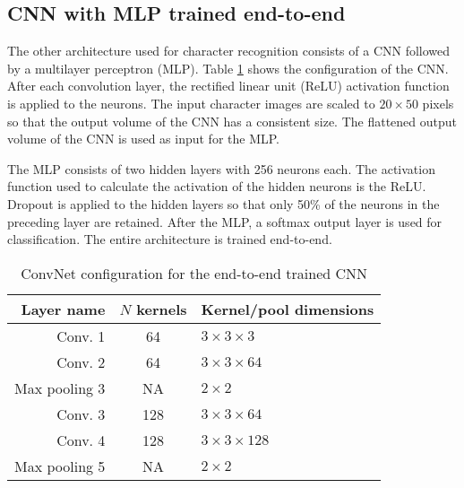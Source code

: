 \subsection{CNN with MLP trained end-to-end}
\label{sec:hmdcnn}

The other architecture used for character recognition consists of a CNN followed by a multilayer perceptron (MLP). Table \ref{tab:hmdcnnconf} shows the configuration of the CNN. After each convolution layer, the rectified linear unit (ReLU) activation function is applied to the neurons. The input character images are scaled to $20 \times 50$ pixels so that the output volume of the CNN has a consistent size. The flattened output volume of the CNN is used as input for the MLP. 

The MLP consists of two hidden layers with 256 neurons each. The activation function used to calculate the activation of the hidden neurons is the ReLU. Dropout is applied to the hidden layers so that only 50\% of the neurons in the preceding layer are retained. After the MLP, a softmax output layer is used for classification. The entire architecture is trained end-to-end. 

\begin{table}
\renewcommand{\arraystretch}{1.3}
\centering
\caption{ConvNet configuration for the end-to-end trained CNN}
\begin{tabular}{r|cl}\hline
Layer name & $N$ kernels & Kernel/pool dimensions \\ \hline \hline
Conv. 1 & 64 & $3 \times 3 \times 3$  \\
Conv. 2 & 64 & $3 \times 3 \times 64$ \\
Max pooling 3 & NA & $2\times 2$ \\
Conv. 3 & 128 & $3 \times 3 \times 64$ \\
Conv. 4 & 128 & $3 \times 3 \times 128$ \\
Max pooling 5 & NA & $2\times 2$ \\ \hline
\end{tabular}
\label{tab:hmdcnnconf}
\end{table}
